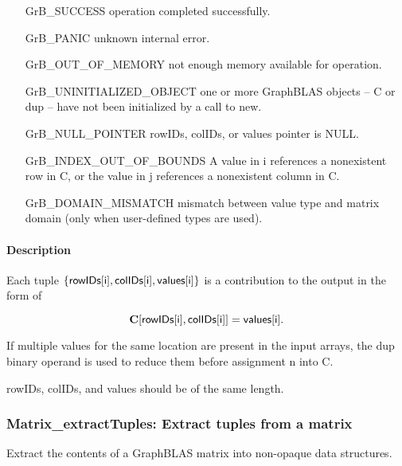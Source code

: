 \begin{itemize}[leftmargin=2.1in]
\item[{\sf GrB\_SUCCESS}]      operation completed successfully.
\item[{\sf GrB\_PANIC}]        unknown internal error.
\item[{\sf GrB\_OUT\_OF\_MEMORY}]     not enough memory available for operation.
\item[{\sf GrB\_UNINITIALIZED\_OBJECT}]     one or more GraphBLAS objects -- {\sf C} or  {\sf dup} -- have not been initialized by a call to {\sf new}.
\item[{\sf GrB\_NULL\_POINTER}]  {\sf rowIDs}, {\sf colIDs}, or {\sf values} pointer is {\sf NULL}.
\item[{\sf GrB\_INDEX\_OUT\_OF\_BOUNDS}]
        A value in i references a nonexistent row in C, or
        the value in j references a nonexistent column in C.
\item[\sf GrB\_DOMAIN\_MISMATCH]  
       mismatch between value type and matrix domain (only when user-defined types are used).
\end{itemize}


\paragraph{Description}
Each tuple $\{ {\sf rowIDs[i]}, {\sf colIDs[i]}, {\sf values[i]}\}$ is a contribution to the output in the form of 

$${\bf C}[{\sf rowIDs[i]}, {\sf colIDs[i]}] = {\sf values[i]}.$$

If multiple values for the same location are present in the input arrays, the 
{\sf dup} binary operand is used to reduce them before assignment n into {\sf C}.
 
{\sf rowIDs}, {\sf colIDs}, and {\sf values} should be of the same length. 


\subsubsection{{\sf Matrix\_extractTuples}: Extract tuples from a matrix}
\label{Sec:Matrix_extractTuples}

Extract the contents of a GraphBLAS matrix into non-opaque data structures.

\paragraph{\syntax}

